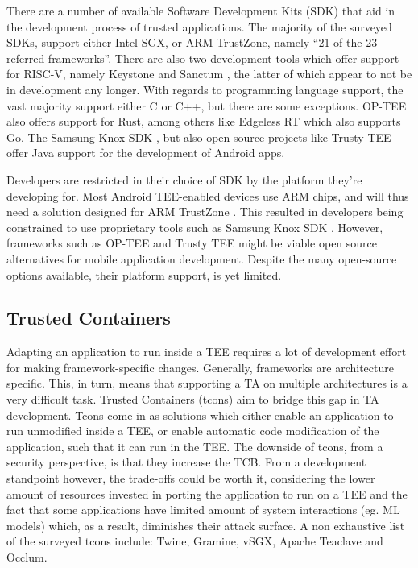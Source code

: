 \documentclass[runningheads,a4paper]{uwsese}
\begin{document}
There are a number of available Software Development Kits (SDK) that aid in the
development process of trusted applications. The majority of the surveyed SDKs,
support either Intel SGX, or ARM TrustZone, namely ``21 of the 23 referred
frameworks''. There are also two development tools which offer support for
RISC-V, namely Keystone \cite{tee_keystone} and Sanctum \cite{tee_sanctum}, the
latter of which appear to not be in development any longer. With regards to
programming language support, the vast majority support either C or C++, but
there are some exceptions. OP-TEE \cite{optee} also offers support for Rust,
among others like Edgeless RT \cite{edgelessrt} which also supports Go. The
Samsung Knox SDK \cite{knox_sdk}, but also open source projects like Trusty TEE
\cite{trustytee} offer Java support for the development of Android apps.

Developers are restricted in their choice of SDK by the platform they're
developing for. Most Android TEE-enabled devices use ARM chips, and will thus
need a solution designed for ARM TrustZone \cite{arm_tz}. This resulted in
developers being constrained to use proprietary tools such as Samsung Knox SDK
\cite{knox_sdk}. However, frameworks such as OP-TEE \cite{optee} and Trusty TEE
\cite{trustytee} might be viable open source alternatives for mobile
application development. Despite the many open-source options available, their
platform support, is yet limited.

\subsection{Trusted Containers}

Adapting an application to run inside a TEE requires a lot of development
effort for making framework-specific changes. Generally, frameworks are
architecture specific. This, in turn, means that supporting a TA on multiple
architectures is a very difficult task. Trusted Containers (tcons) aim to
bridge this gap in TA development. Tcons come in as solutions which either
enable an application to run unmodified inside a TEE, or enable automatic code
modification of the application, such that it can run in the TEE. The downside
of tcons, from a security perspective, is that they increase the TCB. From a
development standpoint however, the trade-offs could be worth it, considering
the lower amount of resources invested in porting the application to run on a
TEE and the fact that some applications have limited amount of system
interactions (eg. ML models) which, as a result, diminishes their attack
surface. A non exhaustive list of the surveyed tcons include: Twine, Gramine,
vSGX, Apache Teaclave and Occlum. 
\end{document}
